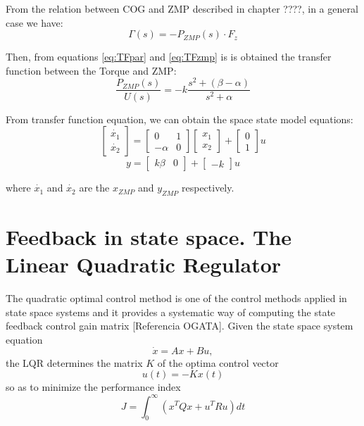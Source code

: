 From the relation between COG and ZMP described in chapter ????, in a general case we have:
\begin{equation}
\Gamma(s) = -P_{ZMP}(s) \cdot F_z
\label{eq:TFzmp}
\end{equation}

Then, from equations \ref{eq:TFpar} and \ref{eq:TFzmp} is is obtained the transfer function between the Torque and ZMP:
\begin{equation}
\frac{P_{ZMP}(s)}{U(s)} = -k \frac{s^2+(\beta - \alpha)}{s^2 + \alpha}
\end{equation}

From transfer function equation, we can obtain the space state model equations:
\begin{equation}
\begin{bmatrix}
\dot{x_1} \\
\dot{x_2}
\end{bmatrix} 
= 
\begin{bmatrix}
0 & 1 \\
-\alpha & 0
\end{bmatrix}
\begin{bmatrix}
x_1 \\
x_2
\end{bmatrix}
+
\begin{bmatrix}
0 \\
1
\end{bmatrix}
u
\end{equation}
\begin{equation}
y = \begin{bmatrix}
k\beta & 0 
\end{bmatrix}
+ \begin{bmatrix}
-k
\end{bmatrix}
u
\end{equation}

where $\dot{x_1} $ and $\dot{x_2}$ are the $x_{ZMP}$ and $y_{ZMP}$ respectively.


\section{Feedback in state space. The Linear Quadratic Regulator}

The quadratic optimal control method is one of the control methods applied in state space systems and it provides a systematic way of computing the state feedback control gain matrix [Referencia OGATA].
Given the state space system equation
\begin{equation}
\dot{x} = Ax+Bu ,
\label{eq:sseq}
\end{equation}
the LQR determines the matrix $K$ of the optima control vector
\begin{equation}
u(t) = -Kx(t)
\label{eq:control}
\end{equation}
so as to minimize the performance index
\begin{equation}
J = \int_{0}^{\infty}(x^{T}Qx+u^{T}Ru) dt
\end{equation}

